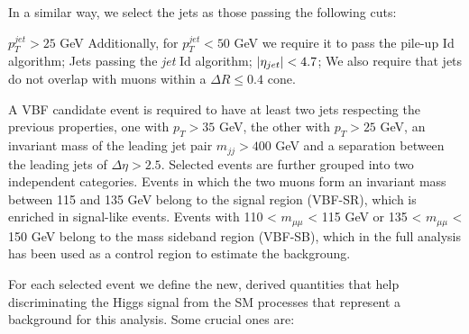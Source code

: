 In a similar way, we select the jets as those passing the following cuts:

\begin{outline}
\1 $p_T^{jet}>25$ GeV 
\1 Additionally, for $p_T^{jet}<50$ GeV we require it to pass the pile-up Id algorithm;
\1  Jets passing the \emph{jet} Id algorithm;
\1  $\abs{\eta_{jet}}<4.7$;
\1 We also require that jets do not overlap with muons within a $\Delta R\leq0.4$ cone.
\end{outline}

A VBF candidate event is required to have at least two jets respecting the previous properties, one with $p_T>35$ GeV, the other with $p_T>25$ GeV, an invariant mass of the leading jet pair $m_{jj}>400$ GeV and a separation between the leading jets of $\Delta\eta>2.5$. Selected events are further grouped into two independent categories. Events in which the two muons form an invariant mass between 115 and
135 GeV belong to the signal region (VBF-SR), which is enriched in signal-like events. Events with 110 < $m_{\mu\mu}$ < 115 GeV or 135 < $m_{\mu\mu}$ < 150 GeV belong to the mass sideband region (VBF-SB), which in the full analysis has been used as a control region to estimate the backgroung.

For each selected event we define the new, derived quantities that help discriminating the Higgs signal from the SM processes that represent a background for this analysis. Some crucial ones are:

